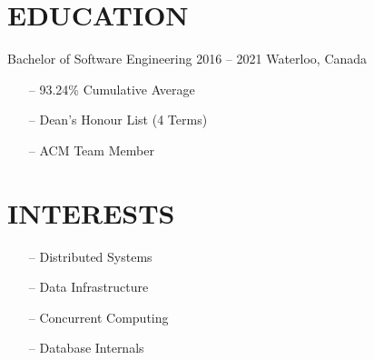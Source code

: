 \documentclass{resume}
\begin{document}
\begin{sidebar}
    \section{EDUCATION}
      \color{tagText}Bachelor of Software Engineering
      \color{subTagText}2016 -- 2021 \separator\color{subTagText}Waterloo, Canada
      \color{bodyText}%
      \begin{itemize}[leftmargin=0.45cm, noitemsep, topsep=0.0cm]%
        \item[--] 93.24\% Cumulative Average
        \item[--] Dean's Honour List (4 Terms)
        \item[--] ACM Team Member
      \end{itemize}%
    \section{INTERESTS}
      \begin{itemize}[leftmargin=0.45cm, noitemsep, topsep=0.0cm]%
        \item[--] Distributed Systems
        \item[--] Data Infrastructure
        \item[--] Concurrent Computing
        \item[--] Database Internals
      \end{itemize}%
  \end{sidebar}
\end{document}
